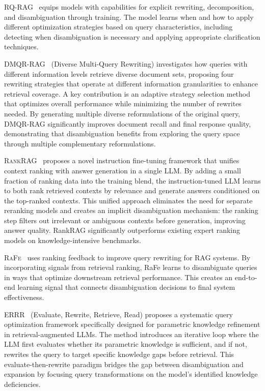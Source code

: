 \documentclass{article}
\begin{document}
\textsc{RQ-RAG}~\citep{RQ-RAG} equips models with capabilities for explicit rewriting, decomposition, and disambiguation through training. The model learns when and how to apply different optimization strategies based on query characteristics, including detecting when disambiguation is necessary and applying appropriate clarification techniques.

\textsc{DMQR-RAG}~\citep{DMQR-RAG} (Diverse Multi-Query Rewriting) investigates how queries with different information levels retrieve diverse document sets, proposing four rewriting strategies that operate at different information granularities to enhance retrieval coverage. A key contribution is an adaptive strategy selection method that optimizes overall performance while minimizing the number of rewrites needed. By generating multiple diverse reformulations of the original query, DMQR-RAG significantly improves document recall and final response quality, demonstrating that disambiguation benefits from exploring the query space through multiple complementary reformulations.

\textsc{RankRAG}~\citep{RankRAG} proposes a novel instruction fine-tuning framework that unifies context ranking with answer generation in a single LLM. By adding a small fraction of ranking data into the training blend, the instruction-tuned LLM learns to both rank retrieved contexts by relevance and generate answers conditioned on the top-ranked contexts. This unified approach eliminates the need for separate reranking models and creates an implicit disambiguation mechanism: the ranking step filters out irrelevant or ambiguous contexts before generation, improving answer quality. RankRAG significantly outperforms existing expert ranking models on knowledge-intensive benchmarks.

\textsc{RaFe}~\citep{RaFe} uses ranking feedback to improve query rewriting for RAG systems. By incorporating signals from retrieval ranking, RaFe learns to disambiguate queries in ways that optimize downstream retrieval performance. This creates an end-to-end learning signal that connects disambiguation decisions to final system effectiveness.

\textsc{ERRR}~\citep{ERRR} (Evaluate, Rewrite, Retrieve, Read) proposes a systematic query optimization framework specifically designed for parametric knowledge refinement in retrieval-augmented LLMs. The method introduces an iterative loop where the LLM first evaluates whether its parametric knowledge is sufficient, and if not, rewrites the query to target specific knowledge gaps before retrieval. This evaluate-then-rewrite paradigm bridges the gap between disambiguation and expansion by focusing query transformations on the model's identified knowledge deficiencies.
\end{document}
